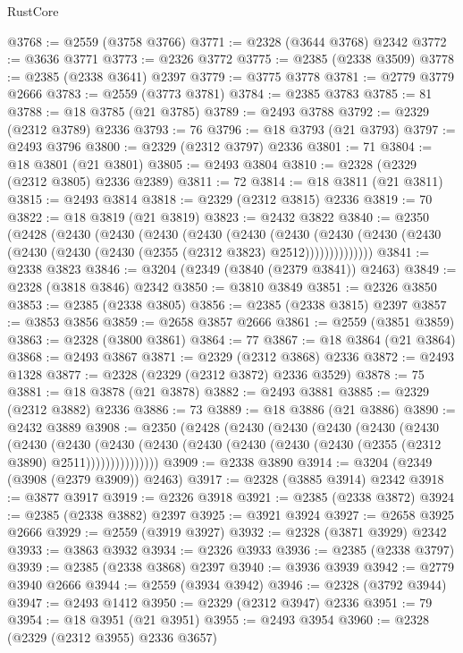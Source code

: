 \begin{lexlean}{RustCore}
\begin{coremodule}
@3768 := @2559 (@3758 @3766)
@3771 := @2328 (@3644 @3768) @2342
@3772 := @3636 @3771
@3773 := @2326 @3772
@3775 := @2385 (@2338 @3509)
@3778 := @2385 (@2338 @3641) @2397
@3779 := @3775 @3778
@3781 := @2779 @3779 @2666
@3783 := @2559 (@3773 @3781)
@3784 := @2385 @3783
@3785 := 81
@3788 := @18 @3785 (@21 @3785)
@3789 := @2493 @3788
@3792 := @2329 (@2312 @3789) @2336
@3793 := 76
@3796 := @18 @3793 (@21 @3793)
@3797 := @2493 @3796
@3800 := @2329 (@2312 @3797) @2336
@3801 := 71
@3804 := @18 @3801 (@21 @3801)
@3805 := @2493 @3804
@3810 := @2328 (@2329 (@2312 @3805) @2336 @2389)
@3811 := 72
@3814 := @18 @3811 (@21 @3811)
@3815 := @2493 @3814
@3818 := @2329 (@2312 @3815) @2336
@3819 := 70
@3822 := @18 @3819 (@21 @3819)
@3823 := @2432 @3822
@3840 := @2350
    (@2428
      (@2430
        (@2430
          (@2430
            (@2430
              (@2430
                (@2430
                  (@2430 (@2430 (@2430 (@2430 (@2430 (@2430 (@2355 (@2312 @3823) @2512))))))))))))))
@3841 := @2338 @3823
@3846 := @3204 (@2349 (@3840 (@2379 @3841)) @2463)
@3849 := @2328 (@3818 @3846) @2342
@3850 := @3810 @3849
@3851 := @2326 @3850
@3853 := @2385 (@2338 @3805)
@3856 := @2385 (@2338 @3815) @2397
@3857 := @3853 @3856
@3859 := @2658 @3857 @2666
@3861 := @2559 (@3851 @3859)
@3863 := @2328 (@3800 @3861)
@3864 := 77
@3867 := @18 @3864 (@21 @3864)
@3868 := @2493 @3867
@3871 := @2329 (@2312 @3868) @2336
@3872 := @2493 @1328
@3877 := @2328 (@2329 (@2312 @3872) @2336 @3529)
@3878 := 75
@3881 := @18 @3878 (@21 @3878)
@3882 := @2493 @3881
@3885 := @2329 (@2312 @3882) @2336
@3886 := 73
@3889 := @18 @3886 (@21 @3886)
@3890 := @2432 @3889
@3908 := @2350
    (@2428
      (@2430
        (@2430
          (@2430
            (@2430
              (@2430
                (@2430
                  (@2430
                    (@2430
                      (@2430 (@2430 (@2430 (@2430 (@2430 (@2355 (@2312 @3890) @2511)))))))))))))))
@3909 := @2338 @3890
@3914 := @3204 (@2349 (@3908 (@2379 @3909)) @2463)
@3917 := @2328 (@3885 @3914) @2342
@3918 := @3877 @3917
@3919 := @2326 @3918
@3921 := @2385 (@2338 @3872)
@3924 := @2385 (@2338 @3882) @2397
@3925 := @3921 @3924
@3927 := @2658 @3925 @2666
@3929 := @2559 (@3919 @3927)
@3932 := @2328 (@3871 @3929) @2342
@3933 := @3863 @3932
@3934 := @2326 @3933
@3936 := @2385 (@2338 @3797)
@3939 := @2385 (@2338 @3868) @2397
@3940 := @3936 @3939
@3942 := @2779 @3940 @2666
@3944 := @2559 (@3934 @3942)
@3946 := @2328 (@3792 @3944)
@3947 := @2493 @1412
@3950 := @2329 (@2312 @3947) @2336
@3951 := 79
@3954 := @18 @3951 (@21 @3951)
@3955 := @2493 @3954
@3960 := @2328 (@2329 (@2312 @3955) @2336 @3657)

\end{coremodule}
\end{lexlean}
